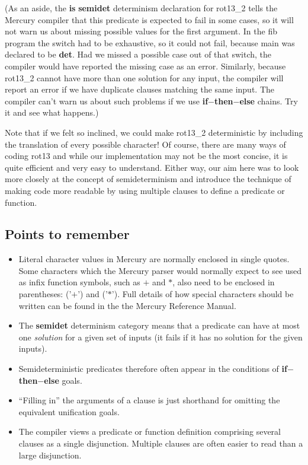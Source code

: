 \documentclass[a4paper,11pt,notitlepage,onecolumn]{book}
\begin{document}
(As an aside, the \textsf{\textbf{is} \textbf{semidet}} determinism declaration for \textsf{rot13\_2} tells
the Mercury compiler that this predicate is expected to fail in some cases,
so it will not warn us about missing possible values for the first argument.
In the \textsf{fib} program the switch had to be exhaustive, so it could not fail,
because \textsf{main} was declared to be \textsf{\textbf{det}}.  Had we missed a possible case out
of that switch, the compiler would have reported the missing case as an
error.  Similarly, because \textsf{rot13\_2} cannot have more than one solution for
any input, the compiler will report an error if we have duplicate clauses
matching the same input.  The compiler can't warn us about such problems if
we use \textsf{\textbf{if}{\ensuremath{-}}\textbf{then}{\ensuremath{-}}\textbf{else}} chains.  Try it and see what happens.)

Note that if we felt so inclined, we could make \textsf{rot13\_2} deterministic by
including the translation of every possible character!  Of course, there are
many ways of coding \textsf{rot13} and while our implementation may not be the most
concise, it is quite efficient and very easy to understand.  Either way, our
aim here was to look more closely at the concept of semideterminism and
introduce the technique of making code more readable by using multiple
clauses to define a predicate or function.

\subsection*{Points to remember}

\begin{itemize}
\item Literal character values in Mercury are normally enclosed in single
quotes.  Some characters which the Mercury parser would normally expect to
see used as infix function symbols, such as \textsf{{\ensuremath{+}}} and \textsf{{\ensuremath{*}}}, also need to be
enclosed in parentheses: \textsf{('{\ensuremath{+}}')} and \textsf{('{\ensuremath{*}}')}.  Full details of how special
characters should be written can be found in the the Mercury Reference
Manual.
\item The \textsf{\textbf{semidet}} determinism category means that a predicate can have
at most one \emph{solution} for a given set of inputs (it fails if it has no
solution for the given inputs).
\item Semideterministic predicates therefore often appear in the conditions
of \textsf{\textbf{if}{\ensuremath{-}}\textbf{then}{\ensuremath{-}}\textbf{else}} goals.
\item ``Filling in'' the arguments of a clause is just shorthand for
omitting the equivalent unification goals.
\item The compiler views a predicate or function definition comprising
several clauses as a single disjunction.
Multiple clauses are often easier to read than a large disjunction.
\end{itemize}
\end{document}
